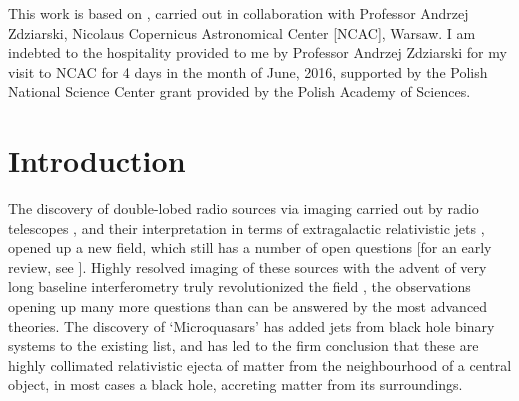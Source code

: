 \begin{checkit}
This work is based on \cite{Zdziarski_et_al.-2016-MNRAS}, carried out in collaboration with Professor Andrzej Zdziarski, Nicolaus Copernicus Astronomical Center [NCAC], Warsaw. I am indebted to the hospitality provided to me by Professor Andrzej Zdziarski for my visit to NCAC for 4 days in the month of June, 2016, supported by the Polish National Science Center grant provided by the Polish Academy of Sciences.
\end{checkit}

\section{Introduction}
\label{sec:introduction--jet_model}
The discovery of double-lobed radio sources via imaging carried out by radio telescopes \citep{MacDonald_et_al.-1968-MNRAS, Mackay-1969-MNRAS, Branson_et_al.-1972-MNRAS, Hargrave-1974-MNRAS, Hargrave_&_Ryle-1974-MNRAS, Fanaroff_&_Riley-1974-MNRAS}, and their interpretation in terms of extragalactic relativistic jets \citep{Longair_et_al.-1973-MNRAS, Blandford_&_Rees-1974-MNRAS,Scheuer-1974-MNRAS}, opened up a new field, which still has a number of open questions [for an early review, see \cite{Begelman_et_al.-1984-RevModPhys}]. Highly resolved imaging of these sources with the advent of very long baseline interferometry truly revolutionized the field \citep{Biretta_et_al.-1986-ApJ,Marscher-1988-ApJ, Reid_et_al.-1989-ApJ}, the observations opening up many more questions than can be answered by the most advanced theories. The discovery of `Microquasars' \citep{Mirabel_&_Rodriguez-1992-Nature, Mirabel_&_Rodriguez-1994-Nature, Mirabel_&_Rodriguez-1998-Nature} has added jets from black hole binary systems to the existing list, and has led to the firm conclusion that these are highly collimated relativistic \citep{Ryle_&_Longair-1967-MNRAS, Blandford_et_al.-1977-Nature} ejecta of matter from the neighbourhood of a central object, in most cases a black hole, accreting matter from its surroundings.

